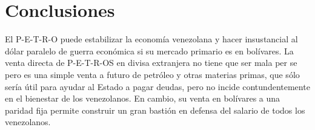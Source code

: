 %
\section{Conclusiones}
\label{sec:conclu}
%
El P-E-T-R-O puede estabilizar la economía venezolana y hacer insustancial al dólar paralelo de guerra económica si su mercado primario es en bolívares. La venta directa de P-E-T-R-OS en divisa extranjera no tiene que ser mala per se pero es una simple venta a futuro de petróleo y otras materias primas, que sólo sería útil para ayudar al Estado a pagar deudas, pero no incide contundentemente en el bienestar de los venezolanos. En cambio, su venta en bolívares a una paridad fija permite construir un gran bastión en defensa del salario de todos los venezolanos.